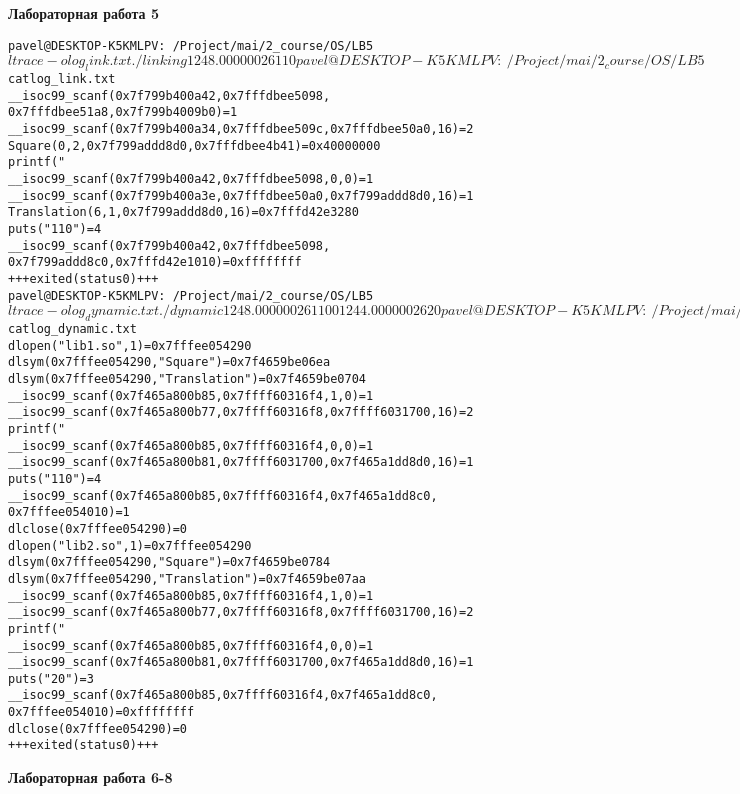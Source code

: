 \documentclass[pdf, unicode, 12pt, a4paper,oneside,fleqn]{article}
\begin{document}
\pagebreak

{\large\textbf{Лабораторная работа 5}}

\begin{alltt}
pavel@DESKTOP-K5KMLPV:~/Project/mai/2_course/OS/LB5$
 ltrace -o log_link.txt ./linking
1
2 4
8.000000
2
6
110
pavel@DESKTOP-K5KMLPV:~/Project/mai/2_course/OS/LB5$ cat log_link.txt
__isoc99_scanf(0x7f799b400a42, 0x7fffdbee5098, 
0x7fffdbee51a8, 0x7f799b4009b0) = 1
__isoc99_scanf(0x7f799b400a34, 0x7fffdbee509c, 0x7fffdbee50a0, 16) = 2
Square(0, 2, 0x7f799addd8d0, 0x7fffdbee4b41) = 0x40000000
printf("%f\textbackslash{n}", 8.000000) = 9
__isoc99_scanf(0x7f799b400a42, 0x7fffdbee5098, 0, 0) = 1
__isoc99_scanf(0x7f799b400a3e, 0x7fffdbee50a0, 0x7f799addd8d0, 16) = 1
Translation(6, 1, 0x7f799addd8d0, 16) = 0x7fffd42e3280
puts("110") = 4
__isoc99_scanf(0x7f799b400a42, 0x7fffdbee5098, 
0x7f799addd8c0, 0x7fffd42e1010) = 0xffffffff
+++ exited (status 0) +++
pavel@DESKTOP-K5KMLPV:~/Project/mai/2_course/OS/LB5$
 ltrace -o log_dynamic.txt ./dynamic
1
2 4
8.000000
2
6
110
0
1
2 4
4.000000
2
6
20
pavel@DESKTOP-K5KMLPV:~/Project/mai/2_course/OS/LB5$ cat log_dynamic.txt
dlopen("lib1.so", 1) = 0x7fffee054290
dlsym(0x7fffee054290, "Square") = 0x7f4659be06ea
dlsym(0x7fffee054290, "Translation") = 0x7f4659be0704
__isoc99_scanf(0x7f465a800b85, 0x7ffff60316f4, 1, 0) = 1
__isoc99_scanf(0x7f465a800b77, 0x7ffff60316f8, 0x7ffff6031700, 16) = 2
printf("%f\textbackslash{n}", 8.000000) = 9
__isoc99_scanf(0x7f465a800b85, 0x7ffff60316f4, 0, 0) = 1
__isoc99_scanf(0x7f465a800b81, 0x7ffff6031700, 0x7f465a1dd8d0, 16) = 1
puts("110") = 4
__isoc99_scanf(0x7f465a800b85, 0x7ffff60316f4, 0x7f465a1dd8c0,
 0x7fffee054010) = 1
dlclose(0x7fffee054290) = 0
dlopen("lib2.so", 1) = 0x7fffee054290
dlsym(0x7fffee054290, "Square") = 0x7f4659be0784
dlsym(0x7fffee054290, "Translation") = 0x7f4659be07aa
__isoc99_scanf(0x7f465a800b85, 0x7ffff60316f4, 1, 0) = 1
__isoc99_scanf(0x7f465a800b77, 0x7ffff60316f8, 0x7ffff6031700, 16) = 2
printf("%f\textbackslash{n}", 4.000000) = 9
__isoc99_scanf(0x7f465a800b85, 0x7ffff60316f4, 0, 0) = 1
__isoc99_scanf(0x7f465a800b81, 0x7ffff6031700, 0x7f465a1dd8d0, 16) = 1
puts("20") = 3
__isoc99_scanf(0x7f465a800b85, 0x7ffff60316f4, 0x7f465a1dd8c0,
 0x7fffee054010) = 0xffffffff
dlclose(0x7fffee054290) = 0
+++ exited (status 0) +++
\end{alltt}

\pagebreak

{\large\textbf{Лабораторная работа 6-8}}
\end{document}
